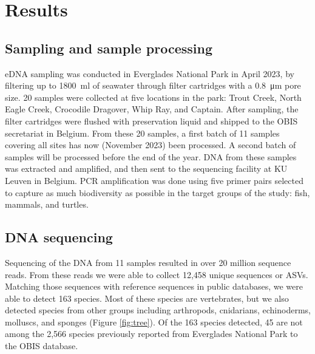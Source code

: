 \documentclass[10pt]{article}
\begin{document}
\section*{Results}
\subsection*{Sampling and sample processing}

\begin{multicols}{2}
eDNA sampling was conducted in Everglades National Park in April 2023, by filtering up to \SI{1800}{\milli\litre} of seawater through filter cartridges with a \SI{0.8}{\micro\metre} pore size. 20 samples were collected at five locations in the park: Trout Creek, North Eagle Creek, Crocodile Dragover, Whip Ray, and Captain. After sampling, the filter cartridges were flushed with preservation liquid and shipped to the OBIS secretariat in Belgium. From these 20 samples, a first batch of 11 samples covering all sites has now (November 2023) been processed. A second batch of samples will be processed before the end of the year. DNA from these samples was extracted and amplified, and then sent to the sequencing facility at KU Leuven in Belgium. PCR amplification was done using five primer pairs selected to capture as much biodiversity as possible in the target groups of the study: fish, mammals, and turtles.
\end{multicols}

\subsection*{DNA sequencing}

\begin{multicols}{2}
Sequencing of the DNA from 11 samples resulted in over 20 million sequence reads. From these reads we were able to collect 12,458 unique sequences or ASVs. Matching those sequences with reference sequences in public databases, we were able to detect 163 species. Most of these species are vertebrates, but we also detected species from other groups including arthropods, cnidarians, echinoderms, molluscs, and sponges (Figure \ref{fig:tree}). Of the 163 species detected, 45 are not among the 2,566 species previously reported from Everglades National Park to the OBIS database.
\end{multicols}





\clearpage
\end{document}
